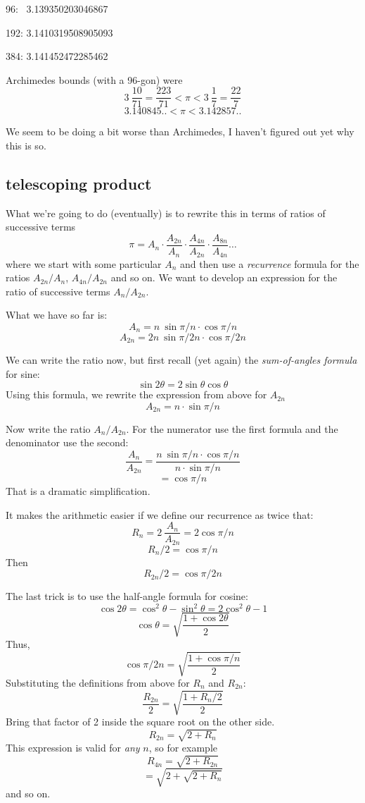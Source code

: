 \documentclass[11pt, oneside]{article}
\begin{document}
\begin{tt}
 96:  \ 3.139350203046867
 
192: 3.1410319508905093

384: 3.141452472285462
\end{tt}

Archimedes bounds (with a 96-gon) were
\[ 3 \ \frac{10}{71} = \frac{223}{71} < \pi < 3 \ \frac{1}{7} = \frac{22}{7} \]
\[ 3.140845.. < \pi < 3.142857.. \]

We seem to be doing a bit worse than Archimedes, I haven't figured out yet why this is so.

\subsection*{telescoping product}
What we're going to do (eventually) is to rewrite this in terms of ratios of successive terms
\[ \pi = A_n \cdot \frac{A_{2n}}{A_n} \cdot \frac{A_{4n}}{A_{2n}} \cdot \frac{A_{8n}}{A_{4n}} \dots \]
where we start with some particular $A_n$ and then use a \emph{recurrence} formula for the ratios $A_{2n}/A_n$, $A_{4n}/A_{2n}$ and so on.  We want to develop an expression for the ratio of successive terms $A_{n}/A_{2n}$.  

What we have so far is:
\[ A_n = n \ \sin \pi/n \cdot \cos \pi/n \]
\[ A_{2n} = 2n \ \sin \pi/2n \cdot \cos \pi/2n \]

We can write the ratio now, but first recall (yet again) the \emph{sum-of-angles formula} for sine:
\[ \sin 2 \theta = 2 \sin \theta \cos \theta \]
Using this formula, we rewrite the expression from above for $A_{2n}$
\[ A_{2n} = n \cdot \sin \pi/n \]

Now write the ratio $A_n/A_{2n}$.  For the numerator use the first formula and the denominator use the second:
\[ \frac{A_n}{A_{2n}} = \frac{n \ \sin \pi/n \cdot \cos \pi/n}{n \cdot \sin \pi/n} \]
\[ = \cos \pi / n \]
That is a dramatic simplification.

It makes the arithmetic easier if we define our recurrence as twice that:
\[ R_n = 2 \ \frac{A_n}{A_{2n}} = 2 \cos \pi/n \]
\[ R_n/2 = \cos \pi / n \]
Then 
\[ R_{2n}/2 = \cos \pi/ 2n \]

The last trick is to use the half-angle formula for cosine:
\[ \cos 2 \theta = \cos^2 \theta - \sin^2 \theta = 2 \cos^2 \theta - 1 \]
\[ \cos \theta = \sqrt{\frac{1 + \cos 2 \theta}{2}} \]
Thus,
\[ \cos \pi/2n = \sqrt{\frac{1 + \cos \pi/n}{2}} \]
Substituting the definitions from above for $R_n$ and $R_{2n}$:
\[ \frac{R_{2n}}{2} =  \sqrt{\frac{1 + R_n/2}{2}} \]
Bring that factor of 2 inside the square root on the other side.
\[ R_{2n} = \sqrt{2 + R_n} \]
This expression is valid for \emph{any} $n$, so for example
\[ R_{4n} = \sqrt{2 + R_{2n}} \]
\[ = \sqrt{2 + \sqrt{2 + R_n}} \]
and so on.
\end{document}
